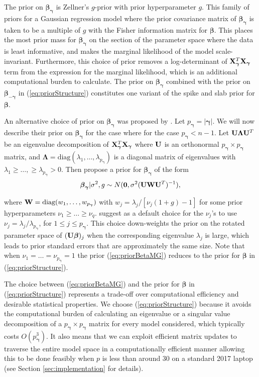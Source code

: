 \documentclass[12pt]{article}
\def\vectorfontone{\bf}
\def\vectorfonttwo{\boldsymbol}
\def\vzero{{\vectorfontone 0}}
\def\vbeta{{\vectorfonttwo \beta}}               %
\def\vgamma{{\vectorfonttwo \gamma}}             %
\def\vnu{{\vectorfonttwo \nu}}                   %
\def\matrixfontone{\bf}
\def\matrixfonttwo{\boldsymbol}
\def\mU{{\matrixfontone U}}                      %
\def\mW{{\matrixfontone W}}                      %
\def\mX{{\matrixfontone X}}                      %
\def\mLambda{{\matrixfonttwo \Lambda}}           %
\begin{document}
The prior on $\vbeta_\vgamma$ is Zellner's $g$-prior \citep[see for example,][]{Zellner1986} with prior 
hyperparameter $g$. This family of priors for a Gaussian regression model where the prior covariance 
matrix of $\vbeta_\vgamma$ is taken to be a multiple of $g$ with the Fisher information matrix for $\vbeta$. 
This places the most prior mass for $\vbeta_\vgamma$ on the section of the parameter space where the data is 
least informative, and makes the marginal likelihood of the model scale-invariant. Furthermore, this 
choice of prior removes a log-determinant of $\mX_\vgamma^T\mX_\vgamma$ term from the expression for the marginal 
likelihood, which is an additional computational burden to calculate.
The prior on $\vbeta_\vgamma$ combined with the prior on $\vbeta_{-\vgamma}$
in (\ref{eq:priorStructure}) constitutes one variant of the spike and slab prior for $\vbeta$.
 
An alternative choice of prior on $\vbeta_\vgamma$ was proposed by \cite{Maruyama2011}. Let
$p_{\vgamma} = |\vgamma|$. We will now describe their prior on $\vbeta_\vgamma$ for the case where for the case
$p_{\vgamma} < n - 1$. Let $\mU\mLambda\mU^T$ be an eigenvalue decomposition of $\mX_\vgamma^T\mX_\vgamma$
where $\mU$ is an orthonormal $p_{\vgamma} \times p_{\vgamma}$ matrix, and $\mLambda = \mbox{diag}(\lambda_1,\ldots,\lambda_{p_{\vgamma}})$ 
is a diagonal matrix of eigenvalues with $\lambda_1\ge\ldots,\ge \lambda_{p_{\vgamma}}>0$. Then \cite{Maruyama2011} 
propose a prior for $\vbeta_\vgamma$ of the form
\begin{equation}
\label{eq:priorBetaMG}
\vbeta_\vgamma | \sigma^2, g \sim N(\vzero, \sigma^2 (\mU\mW\mU^T)^{-1}),   
\end{equation} 

\noindent where $\mW = \mbox{diag}(w_1,\ldots,w_{p_{\vgamma}})$ with $ w_j = \lambda_j/[\nu_j(1 + g) - 1]$ for 
some prior hyperparameters $\nu_1 \ge \ldots \ge \nu_q$. \cite{Maruyama2011} suggest as a default 
choice for the $\nu_j$'s to use $\nu_j = \lambda_j/\lambda_{p_{\vgamma}}$, for $1\le j \le p_{\vgamma}$. 
This choice down-weights the prior on the rotated parameter space of $(\mU \vbeta)_j$ when the 
corresponding eigenvalue $\lambda_j$ is large, which leads to prior standard errors that are 
approximately the same size. Note that when $\nu_1 = \ldots = \nu_{p_{\vgamma}} = 1$ the prior 
(\ref{eq:priorBetaMG}) reduces to the prior for $\vbeta$ in (\ref{eq:priorStructure}). 

The choice between (\ref{eq:priorBetaMG}) and the prior for $\vbeta$ in (\ref{eq:priorStructure}) 
represents a trade-off over computational efficiency and desirable statistical properties. We choose
(\ref{eq:priorStructure}) because it avoids the computational burden of calculating an eigenvalue or a singular 
value decomposition of a $p_{\vgamma}\times p_{\vgamma}$ matrix for every model considered,
which typically costs $O(p_{\vgamma}^3)$. 
It also means that we can 
exploit efficient matrix updates to traverse the entire model space in a computationally efficient 
manner allowing this to be done feasibly when $p$ is less than around 30 on a standard 2017 laptop 
(see Section \ref{sec:implementation} for details).
\end{document}
